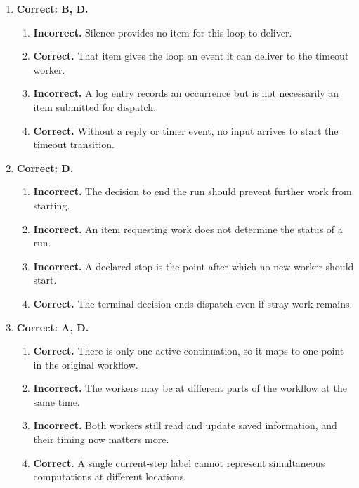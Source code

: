 \begin{enumerate}[start=41,itemsep=0.7\baselineskip]
\item[{\hyperref[exercise:47]{47.}}] \begin{minipage}[t]{\linewidth}
\textbf{Correct: B, D.}
\begin{enumerate}[label=\textnormal{(\Alph*)},leftmargin=*,itemsep=0pt]
\item \textbf{Incorrect.} Silence provides no item for this loop to deliver.
\item \textbf{Correct.} That item gives the loop an event it can deliver to the timeout worker.
\item \textbf{Incorrect.} A log entry records an occurrence but is not necessarily an item submitted for dispatch.
\item \textbf{Correct.} Without a reply or timer event, no input arrives to start the timeout transition.
\end{enumerate}
\end{minipage}

\item[{\hyperref[exercise:48]{48.}}] \begin{minipage}[t]{\linewidth}
\textbf{Correct: D.}
\begin{enumerate}[label=\textnormal{(\Alph*)},leftmargin=*,itemsep=0pt]
\item \textbf{Incorrect.} The decision to end the run should prevent further work from starting.
\item \textbf{Incorrect.} An item requesting work does not determine the status of a run.
\item \textbf{Incorrect.} A declared stop is the point after which no new worker should start.
\item \textbf{Correct.} The terminal decision ends dispatch even if stray work remains.
\end{enumerate}
\end{minipage}

\item[{\hyperref[exercise:49]{49.}}] \begin{minipage}[t]{\linewidth}
\textbf{Correct: A, D.}
\begin{enumerate}[label=\textnormal{(\Alph*)},leftmargin=*,itemsep=0pt]
\item \textbf{Correct.} There is only one active continuation, so it maps to one point in the original workflow.
\item \textbf{Incorrect.} The workers may be at different parts of the workflow at the same time.
\item \textbf{Incorrect.} Both workers still read and update saved information, and their timing now matters more.
\item \textbf{Correct.} A single current-step label cannot represent simultaneous computations at different locations.
\end{enumerate}
\end{minipage}


\end{enumerate}
